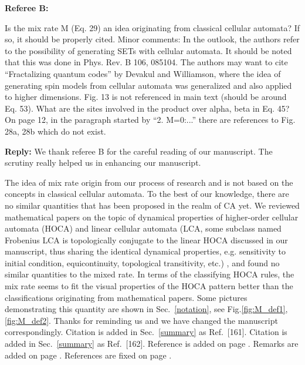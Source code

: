 \documentclass{article}
\begin{document}
\begin{tcolorbox}[title=Reply 11 (point-to-point reply),breakable]
\textbf{Referee B:} 
\begin{outline}[enumerate]
    \1 Is the mix rate M (Eq. 29) an idea originating from classical
cellular automata? If so, it should be properly cited.
\1 Minor comments:
\2 In the outlook, the authors refer to the possibility of generating
SETs with cellular automata. It should be noted that this was done in
Phys. Rev. B 106, 085104.
\2 The authors may want to cite ``Fractalizing quantum codes'' by Devakul
and Williamson, where the idea of generating spin models from cellular
automata was generalized and also applied to higher dimensions.
\2 Fig. 13 is not referenced in main text (should be around Eq. 53).
\2 What are the sites involved in the product over alpha, beta in Eq. 45?
\2 On page 12, in the paragraph started by ``2. M=0:...'' there are
references to Fig. 28a, 28b which do not exist.
\end{outline}

\tcblower
\textbf{Reply:}
We thank referee B for the careful reading of our manuscript. The scrutiny really helped us in enhancing our manuscript.
\begin{outline}[enumerate]
    \1 The idea of mix rate origin from our process of research and is not based on the concepts in classical cellular automata. To the best of our knowledge, there are no similar quantities that has been proposed in the realm of CA yet. We reviewed mathematical papers on the topic of dynamical properties of higher-order cellular automata (HOCA) and linear cellular automata (LCA, some subclass named Frobenius LCA is topologically conjugate to the linear HOCA discussed in our manuscript, thus sharing the identical dynamical properties, e.g. sensitivity to initial condition, equicontinuity, topological transitivity, etc.) , and found no similar quantities to the mixed rate. In terms of the classifying HOCA rules, the mix rate seems to fit the visual properties of the HOCA pattern better than the classifications originating from mathematical papers. Some pictures demonstrating this quantity are shown in Sec.~\ref{notation}, see Fig.\ref{fig:M_def1}, \ref{fig:M_def2}.
    \1 Thanks for reminding us and we have changed the manuscript correspondingly.
    \2 Citation is added in Sec.~\ref{summary} as Ref.~[161].
    \2 Citation is added in Sec.~\ref{summary} as Ref.~[162].
    \2 Reference is added on page \pageref{crit2}.
    \2 Remarks are added on page \pageref{sc_derivation}.
    \2 References are fixed on page \pageref{M_expl}.

\end{outline}
\end{tcolorbox}



%
%



\end{document}
